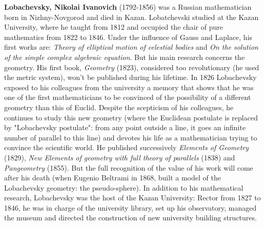 \textbf{Lobachevsky, Nikolai Ivanovich} (1792-1856) was a Russian mathematician born in Nizhny-Novgorod and died in Kazan. Lobatchevski studied at the Kazan University, where he taught from 1812 and occupied the chair of pure mathematics from 1822 to 1846. Under the influence of Gauss and Laplace, his first works are: \textit{Theory of elliptical motion of celestial bodies} and \textit{On the solution of the simple complex algebraic equation}. But his main research concerns the geometry. His first book, \textit{Geometry} (1823), considered too revolutionary (he used the metric system), won't be published during his lifetime. In 1826 Lobachevsky exposed to his colleagues from the university a memory that shows that he was one of the first mathematicians to be convinced of the possibility of a different geometry than this of Euclid. Despite the scepticism of his colleagues, he continues to study this new geometry (where the Euclidean postulate is replaced by "Lobachevsky postulate": from any point outside a line, it goes an infinite number of parallel to this line) and devotes his life as a mathematician trying to convince the scientific world. He published successively \textit{Elements of Geometry} (1829), \textit{New Elements of geometry with full theory of parallels} (1838) and \textit{Pangeometry} (1855). But the full recognition of the value of his work will come after his death (when Eugenio Beltrami in 1868, built a model of the Lobachevsky geometry: the pseudo-sphere). In addition to his mathematical research, Lobachevsky was the host of the Kazan University: Rector from 1827 to 1846, he was in charge of the university library, set up his observatory, managed the museum and directed the construction of new university building structures.

